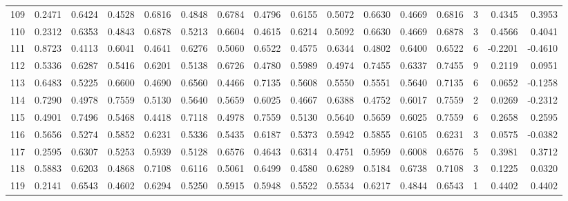 \begin{tabular}{lrrrrrrrrrrrrrrr}
109 &      0.2471 &  0.6424 &  0.4528 &  0.6816 &  0.4848 &  0.6784 &  0.4796 &  0.6155 &  0.5072 &  0.6630 &   0.4669 &     0.6816 &      3 &                    0.4345 &                     0.3953 \\
110 &      0.2312 &  0.6353 &  0.4843 &  0.6878 &  0.5213 &  0.6604 &  0.4615 &  0.6214 &  0.5092 &  0.6630 &   0.4669 &     0.6878 &      3 &                    0.4566 &                     0.4041 \\
111 &      0.8723 &  0.4113 &  0.6041 &  0.4641 &  0.6276 &  0.5060 &  0.6522 &  0.4575 &  0.6344 &  0.4802 &   0.6400 &     0.6522 &      6 &                   -0.2201 &                    -0.4610 \\
112 &      0.5336 &  0.6287 &  0.5416 &  0.6201 &  0.5138 &  0.6726 &  0.4780 &  0.5989 &  0.4974 &  0.7455 &   0.6337 &     0.7455 &      9 &                    0.2119 &                     0.0951 \\
113 &      0.6483 &  0.5225 &  0.6600 &  0.4690 &  0.6560 &  0.4466 &  0.7135 &  0.5608 &  0.5550 &  0.5551 &   0.5640 &     0.7135 &      6 &                    0.0652 &                    -0.1258 \\
114 &      0.7290 &  0.4978 &  0.7559 &  0.5130 &  0.5640 &  0.5659 &  0.6025 &  0.4667 &  0.6388 &  0.4752 &   0.6017 &     0.7559 &      2 &                    0.0269 &                    -0.2312 \\
115 &      0.4901 &  0.7496 &  0.5468 &  0.4418 &  0.7118 &  0.4978 &  0.7559 &  0.5130 &  0.5640 &  0.5659 &   0.6025 &     0.7559 &      6 &                    0.2658 &                     0.2595 \\
116 &      0.5656 &  0.5274 &  0.5852 &  0.6231 &  0.5336 &  0.5435 &  0.6187 &  0.5373 &  0.5942 &  0.5855 &   0.6105 &     0.6231 &      3 &                    0.0575 &                    -0.0382 \\
117 &      0.2595 &  0.6307 &  0.5253 &  0.5939 &  0.5128 &  0.6576 &  0.4643 &  0.6314 &  0.4751 &  0.5959 &   0.6008 &     0.6576 &      5 &                    0.3981 &                     0.3712 \\
118 &      0.5883 &  0.6203 &  0.4868 &  0.7108 &  0.6116 &  0.5061 &  0.6499 &  0.4580 &  0.6289 &  0.5184 &   0.6738 &     0.7108 &      3 &                    0.1225 &                     0.0320 \\
119 &      0.2141 &  0.6543 &  0.4602 &  0.6294 &  0.5250 &  0.5915 &  0.5948 &  0.5522 &  0.5534 &  0.6217 &   0.4844 &     0.6543 &      1 &                    0.4402 &                     0.4402 \\

\end{tabular}

